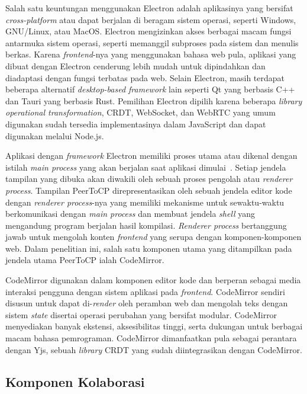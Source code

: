 Salah satu keuntungan menggunakan Electron adalah aplikasinya yang bersifat \textit{cross-platform} atau dapat berjalan di beragam sistem operasi, seperti Windows, GNU/Linux, atau MacOS. Electron mengizinkan akses berbagai macam fungsi antarmuka sistem operasi, seperti memanggil subproses pada sistem dan menulis berkas. Karena \textit{frontend}-nya yang menggunakan bahasa web pula, aplikasi yang dibuat dengan Electron cenderung lebih mudah untuk dipindahkan dan diadaptasi dengan fungsi terbatas pada web. Selain Electron, masih terdapat beberapa alternatif \textit{desktop-based framework} lain seperti Qt yang berbasis C++ dan Tauri yang berbasis Rust. Pemilihan Electron dipilih karena beberapa \textit{library} \textit{operational transformation}, CRDT, WebSocket, dan WebRTC yang umum digunakan sudah tersedia implementasinya dalam JavaScript dan dapat digunakan melalui Node.js.

Aplikasi dengan \textit{framework} Electron memiliki proses utama atau dikenal dengan istilah \textit{main process} yang akan berjalan saat aplikasi dimulai~\citep{electron}. Setiap jendela tampilan yang dibuka akan diwakili oleh sebuah proses pengolah atau \textit{renderer process}. Tampilan PeerToCP direpresentasikan oleh sebuah jendela editor kode dengan \textit{renderer process}-nya yang memiliki mekanisme untuk sewaktu-waktu berkomunikasi dengan \textit{main process} dan membuat jendela \textit{shell} yang mengandung program berjalan hasil kompilasi. \textit{Renderer process} bertanggung jawab untuk mengolah konten \textit{frontend} yang serupa dengan komponen-komponen web. Dalam penelitian ini, salah satu komponen utama yang ditampilkan pada jendela utama PeerToCP ialah CodeMirror.

CodeMirror digunakan dalam komponen editor kode dan berperan sebagai media interaksi pengguna dengan sistem aplikasi pada \textit{frontend}. CodeMirror sendiri disusun untuk dapat di-\textit{render} oleh peramban web dan mengolah teks dengan sistem \textit{state} disertai operasi perubahan yang bersifat modular. CodeMirror menyediakan banyak ekstensi, aksesibilitas tinggi, serta dukungan untuk berbagai macam bahasa pemrograman. CodeMirror dimanfaatkan pula sebagai perantara dengan Yjs, sebuah \textit{library} CRDT yang sudah diintegrasikan dengan CodeMirror.

\subsection{Komponen Kolaborasi}

